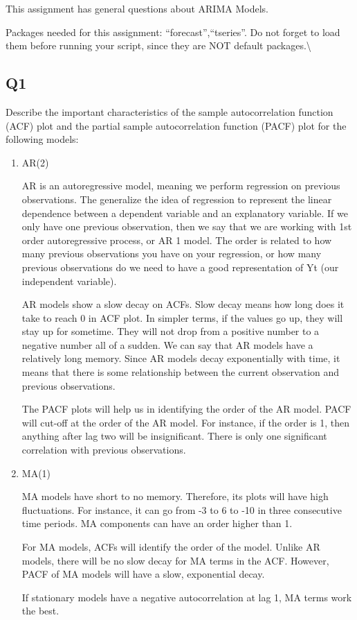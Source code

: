 \documentclass[
]{article}
\begin{document}
This assignment has general questions about ARIMA Models.

Packages needed for this assignment: ``forecast'',``tseries''. Do not
forget to load them before running your script, since they are NOT
default packages.\textbackslash{}

\hypertarget{q1}{%
\subsection{Q1}\label{q1}}

Describe the important characteristics of the sample autocorrelation
function (ACF) plot and the partial sample autocorrelation function
(PACF) plot for the following models:

\begin{enumerate}[label=(\alph*)]

\item AR(2)

AR is an autoregressive model, meaning we perform regression on previous observations. The generalize the idea of regression to represent the linear dependence between a dependent variable and an explanatory variable. If we only have one previous observation, then we say that we are working with 1st order autoregressive process, or AR 1 model. The order is related to how many previous observations you have on your regression, or how many previous observations do we need to have a good representation of Yt (our independent variable). 

AR models show a slow decay on ACFs. Slow decay means how long does it take to reach 0 in ACF plot. In simpler terms, if the values go up, they will stay up for sometime. They will not drop from a positive number to a negative number all of a sudden. We can say that AR models have a relatively long memory. Since AR models decay exponentially with time, it means that there is some relationship between the current observation and previous observations. 

The PACF plots will help us in identifying the order of the AR model. PACF will cut-off at the order of the AR model. For instance, if the order is 1, then anything after lag two will be insignificant. There is only one significant correlation with previous observations.

\item MA(1)

MA models have short to no memory. Therefore, its plots will have high fluctuations. For instance, it can go from -3 to 6 to -10 in three consecutive time periods. MA components can have an order higher than 1. 

For MA models, ACFs will identify the order of the model. Unlike AR models, there will be no slow decay for MA terms in the ACF. However, PACF of MA models will have a slow, exponential decay. 

If stationary models have a negative autocorrelation at lag 1, MA terms work the best.

\end{enumerate}
\end{document}
